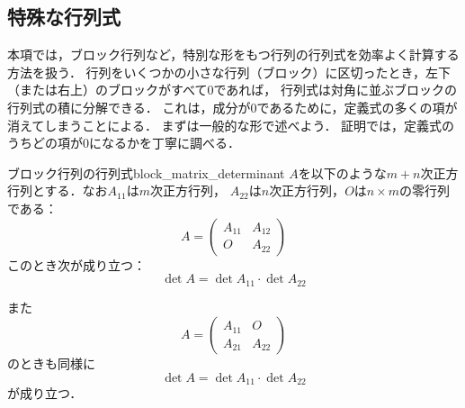 \subsection{特殊な行列式}

本項では，ブロック行列など，特別な形をもつ行列の行列式を効率よく計算する方法を扱う．
行列をいくつかの小さな行列（ブロック）に区切ったとき，左下（または右上）のブロックがすべて$0$であれば，
行列式は対角に並ぶブロックの行列式の積に分解できる．
これは，成分が$0$であるために，定義式の多くの項が消えてしまうことによる．
まずは一般的な形で述べよう．
証明では，定義式のうちどの項が$0$になるかを丁寧に調べる．


\begin{prop}{ブロック行列の行列式}{block_matrix_determinant}
  $A$を以下のような$m+n$次正方行列とする．なお$A_{11}$は$m$次正方行列，
  $A_{22}$は$n$次正方行列，$O$は$n \times m$の零行列である：
  \[
    A=
    \begin{pmatrix}
      A_{11} & A_{12} \\
      O & A_{22}
    \end{pmatrix}
  \]
  このとき次が成り立つ：
  \[
    \det A = \det A_{11} \cdot \det A_{22}
  \]

  また
  \[
  A = \begin{pmatrix}
    A_{11} & O \\
    A_{21} & A_{22}
  \end{pmatrix}
  \]
  のときも同様に
  \[
    \det A = \det A_{11} \cdot \det A_{22}
  \]  
が成り立つ．
\end{prop}


